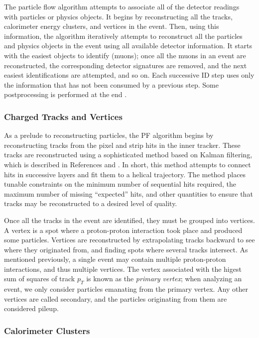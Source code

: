 The particle flow algorithm attempts to associate all of the detector
readings with particles or physics objects. It begins by
reconstructing all the tracks, calorimeter energy clusters, and
vertices in the event. Then, using this information, the algorithm
iteratively attempts to reconstruct all the particles and physics
objects in the event using all available detector information. It
starts with the easiest objects to identify (muons); once all the
muons in an event are reconstructed, the corresponding detector
signatures are removed, and the next easiest identifications are
attempted, and so on. Each successive ID step uses only the
information that has not been consumed by a previous step. Some
postprocessing is performed at the end \cite{particleflow}.

\subsubsection{Charged Tracks and Vertices}
\label{sssec:cms:pf:trackvert}

As a prelude to reconstructing particles, the PF algorithm begins by
reconstructing tracks from the pixel and strip hits in the inner
tracker. These tracks are reconstructed using a sophisticated method
based on Kalman filtering, which is described in References
\cite{kalman1} and \cite{kalman2}. In short, this method attempts to
connect hits in successive layers and fit them to a helical
trajectory. The method places tunable constraints on the minimum
number of sequential hits required, the maximum number of missing
``expected'' hits, and other quantities to ensure that tracks may be
reconstructed to a desired level of quality.

Once all the tracks in the event are identified, they must be grouped
into vertices. A vertex is a spot where a proton-proton interaction
took place and produced some particles. Vertices are reconstructed by
extrapolating tracks backward to see where they originated from, and finding
spots where several tracks intersect. As mentioned previously, a
single event may contain multiple proton-proton interactions, and thus
multiple vertices. The vertex associated with the higest sum of
squares of track $p_T$ is known as the \emph{primary vertex}; when
analyzing an event, we only consider particles emanating from the
primary vertex. Any other vertices are called secondary, and the
particles originating from them are considered pileup.

\subsubsection{Calorimeter Clusters}
\label{sssec:cms:pf:caloclusters}

